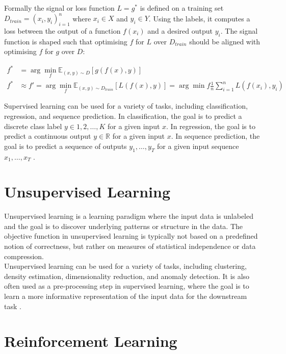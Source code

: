 Formally the signal or loss function $L = g^*$ is defined on a training set $D_{train} = {(x_i,y_i)}_{i=1}^n$ where $x_i \in X$ and $y_i \in Y$. Using the 
labels, it computes a loss between the output of a function $f(x_i)$ and a desired output $y_i$. The signal function is shaped such that optimising $f$ for $L$ 
over $D_{train}$ should be aligned with optimising $f$ for $g$ over $D$:

\begin{equation}
\begin{aligned}
f^* &= \arg\min_{f} \mathbb{E}_{(x,y) \sim D}[g(f(x), y)] \\
f^* &\approx f' = \arg\min_{f} \mathbb{E}_{(x,y) \sim D_{train}}[L(f(x),y)] = \arg\min{f} \frac{1}{n}\sum_{i=1}^n L(f(x_i),y_i)
\end{aligned}
\end{equation}


Supervised learning can be used for a variety of tasks, including classification, regression, and sequence prediction. In classification, 
the goal is to predict a discrete class label $y \in {1,2,\ldots,K}$ for a given input $x$. In regression, the goal is to predict a continuous 
output $y \in \mathbb{R}$ for a given input $x$. In sequence prediction, the goal is to predict a sequence of outputs $y_1,\ldots,y_T$ for a 
given input sequence $x_1,\ldots,x_T$ \cite[chapter~4]{bishop} \cite[chapter~5, chapter~6]{Goodfellow}.

\section{Unsupervised Learning}
\label{section:unsup_learn}
Unsupervised learning is a learning paradigm where the input data is unlabeled and the goal is to discover underlying patterns or structure in the data.
The objective function in unsupervised learning is typically not based on a predefined notion of correctness, but rather on measures of statistical
independence or data compression.\\

Unsupervised learning can be used for a variety of tasks, including clustering, density estimation, dimensionality reduction, and anomaly detection.
It is also often used as a pre-processing step in supervised learning, where the goal is to learn a more informative representation of the input data 
for the downstream task \cite[chapter~9]{bishop} \cite[chapter~5]{Goodfellow}. 

\section{Reinforcement Learning}
\label{section:rl}

